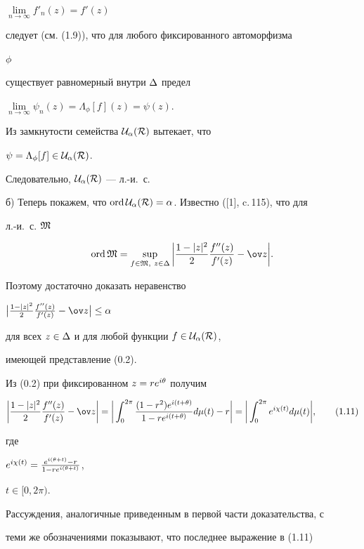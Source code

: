 \begin{pf}
$\lim\limits_{n\to\infty}f'_n(z)=f'(z)$


следует (см. (1.9)), что для любого фиксированного автоморфизма


$\phi$




существует равномерный внутри $\Delta$ предел


$\lim\limits_{n\to\infty}\psi_n(z)=\Lambda_\phi[f](z)=\psi(z)$.


Из замкнутости семейства $\cal U_\alpha(R)$ вытекает, что


$\psi=\Lambda_\phi[f]\in\cal U_\alpha(R)$.


Следовательно, $\cal U_\alpha(R)$ --- л.-и.~с.





б) Теперь покажем, что $\operatorname{ord}\cal U_\alpha(R)=\alpha$. Известно ([1], c.\,115), что для


л.-и.~с. $\frak M$


$$


\ord\GM=\sup_{f\in\GM,\ z\in\De}\bigg|\frac{1-|z|^2}{2}\frac{f''(z)}


{f'(z)}-\ov z\bigg|.


$$


Поэтому достаточно доказать неравенство


$\big|\frac{1-|z|^2}{2}\frac{f''(z)}{f'(z)}-\ov z\big|\le\al$


для всех $z\in\Delta$ и для любой функции $f\in\cal U_\alpha(R)$,


имеющей представление (0.2).


Из (0.2) при фиксированном $z=re^{i\theta}$ получим


\begin{equation}


\bigg|\frac{1-|z|^2}{2}\frac{f''(z)}


{f'(z)}-\ov z\bigg|=\bigg|\int_0^{2\pi}\frac{(1-r^2)e^{i(t+\te)}}


{1-re^{i(t+\te)}} d\mu(t)-r\bigg|=


\bigg|\int_0^{2\pi}e^{i\chi(t)} d\mu(t)\bigg|, \tag{1.11}


\end{equation}


где


$e^{i\chi(t)}=\frac{e^{i(\theta+t)}-r} {1-re^{i(\theta+t)}}$,


$t\in[0,2\pi)$.


Рассуждения, аналогичные приведенным в первой части доказательства, с


теми же обозначениями показывают, что последнее выражение в (1.11)



\end{pf}
